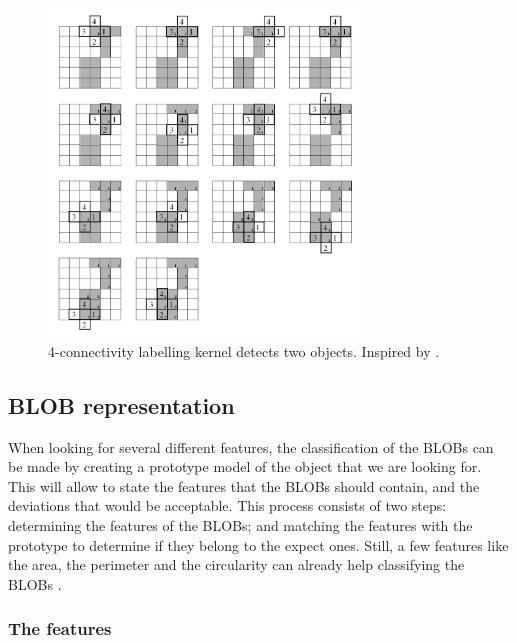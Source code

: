 \begin{figure}[htbp]
\centering
\includegraphics[width=0.75\textwidth]{Pictures/Theory/4connec_kernel.png}
\caption{4-connectivity labelling kernel detects two objects. Inspired by \citep{ip_book}.}
\label{fig:4connecK}
\end{figure}

\subsection{BLOB representation}
When looking for several different features, the classification of the BLOBs can be made by creating a prototype model of the object that we are looking for. This will allow to state the features that the BLOBs should contain, and the deviations that would be acceptable. This process consists of two steps: determining the features of the BLOBs; and matching the features with the prototype to determine if they belong to the expect ones. Still, a few features like the area, the perimeter and the circularity can already help classifying the BLOBs \citep{ip_book}.

\subsubsection{The features}

